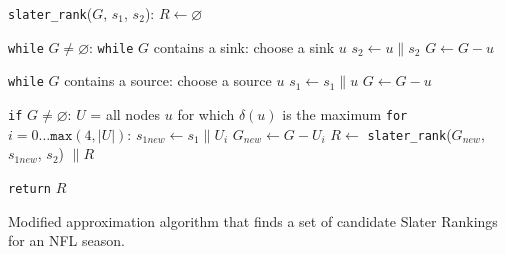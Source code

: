 \documentclass[11pt]{article}
\begin{document}
\begin{algorithm}[!htb]
\texttt{slater\_rank}($G$, $s_1$, $s_2$):\newline
\hspace*{2em} $R \gets \varnothing$\newline

\hspace*{2em} \texttt{while} $G \ne \varnothing$:\newline
\hspace*{4em} \texttt{while} $G$ contains a sink:\newline
\hspace*{6em} choose a sink $u$\newline
\hspace*{6em} $s_2 \gets u \parallel s_2$\newline
\hspace*{6em} $G \gets G - u$\newline

\hspace*{4em} \texttt{while} $G$ contains a source:\newline
\hspace*{6em} choose a source $u$\newline
\hspace*{6em} $s_1 \gets s_1 \parallel u$\newline
\hspace*{6em} $G \gets G - u$\newline

\hspace*{4em} \texttt{if} $G \ne \varnothing$:\newline
\hspace*{6em} $U$ = all nodes $u$ for which $\delta(u)$ is the maximum\newline
\hspace*{6em} \texttt{for} $i = 0 \ldots \texttt{max}(4, |U|)$:\newline
\hspace*{8em} $s_{1 new} \gets s_1 \parallel U_i$\newline
\hspace*{8em} $G_{new} \gets G - U_i$\newline
\hspace*{8em} $R \gets$ \texttt{slater\_rank}($G_{new}$, $s_{1new}$, $s_2$) $\parallel R$ \newline

\hspace*{2em} \texttt{return} $R$\newline
\caption{Modified approximation algorithm that finds a set of candidate Slater Rankings for an NFL season.}\label{algo:slater_ranking}
\end{algorithm}
\end{document}
